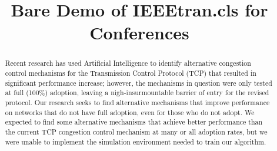 \documentclass[conference]{IEEEtran}
\begin{document}
%
\title{Bare Demo of IEEEtran.cls for Conferences}


\author{
\and
{}
\and
{}
}


% 






\maketitle


\begin{abstract}
Recent research has used Artificial Intelligence to identify alternative
congestion control mechanisms for the Transmission Control Protocol (TCP) that
resulted in significant performance increase; however, the mechanisms in
question were only tested at full (100\%) adoption, leaving a
nigh-insurmountable barrier of entry for the revised protocol. Our research
seeks to find alternative mechanisms that improve performance on networks that
do not have full adoption, even for those who do not adopt. We expected to find
some alternative mechanisms that achieve better performance than the current
TCP congestion control mechanism at many or all adoption rates, but we were
unable to implement the simulation environment needed to train our algorithm.
\end{abstract}
\end{document}
